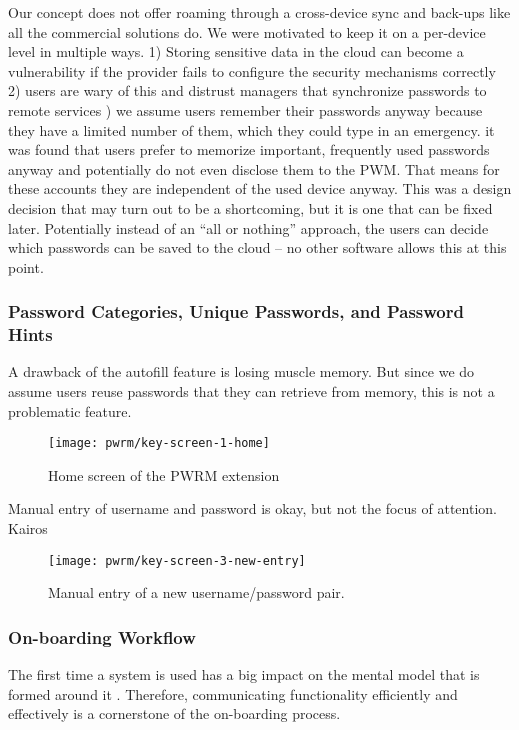 Our concept does not offer roaming through a cross-device sync and back-ups like all the commercial solutions do. We were motivated to keep it on a per-device level in multiple ways. 1) Storing sensitive data in the cloud can become a vulnerability if the provider fails to configure the security mechanisms correctly 2) users are wary of this and distrust managers that synchronize passwords to remote services ) we assume users remember their passwords anyway because they have a limited number of them, which they could type in an emergency. it was found that users prefer to memorize important, frequently used passwords anyway and potentially do not even disclose them to the PWM. That means for these accounts they are independent of the used device anyway. This was a design decision that may turn out to be a shortcoming, but it is one that can be fixed later. Potentially instead of an ``all or nothing'' approach, the users can decide which passwords can be saved to the cloud -- no other software allows this at this point. 


\subsubsection{Password Categories, Unique Passwords, and Password Hints}
A drawback of the autofill feature is losing muscle memory. But since we do assume users reuse passwords that they can retrieve from memory, this is not a problematic feature. 

\begin{figure}[htbp]
	\centering
	\texttt{[image: pwrm/key-screen-1-home]}
	\caption{\label{fig:pwrm:key-screen-home} Home screen of the PWRM extension}
\end{figure}

Manual entry of username and password is okay, but not the focus of attention. Kairos 
\begin{figure}[htbp]
	\centering
	\texttt{[image: pwrm/key-screen-3-new-entry]}
	\caption{\label{fig:pwrm:key-screen-entry} Manual entry of a new username/password pair. }
\end{figure}

\subsubsection{On-boarding Workflow}
The first time a system is used has a big impact on the mental model that is formed around it \ar. Therefore, communicating functionality efficiently and effectively is a cornerstone of the on-boarding process.  

